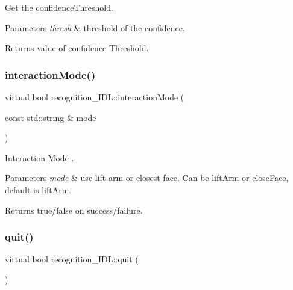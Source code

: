 Get the confidence\+Threshold. 


\begin{DoxyParams}{Parameters}
{\em thresh} & threshold of the confidence. \\
\hline
\end{DoxyParams}
\begin{DoxyReturn}{Returns}
value of confidence Threshold. 
\end{DoxyReturn}
\mbox{\label{classrecognition__IDL_afb70498b2cf99712cfad0e19d171dcab}} 
\subsubsection{\texorpdfstring{interaction\+Mode()}{interactionMode()}}
{\footnotesize\ttfamily virtual bool recognition\+\_\+\+I\+D\+L\+::interaction\+Mode (\begin{DoxyParamCaption}\item[{const std\+::string \&}]{mode }\end{DoxyParamCaption})\hspace{0.3cm}{\ttfamily [virtual]}}



Interaction Mode . 


\begin{DoxyParams}{Parameters}
{\em mode} & use lift arm or closest face. Can be lift\+Arm or close\+Face, default is lift\+Arm. \\
\hline
\end{DoxyParams}
\begin{DoxyReturn}{Returns}
true/false on success/failure. 
\end{DoxyReturn}
\mbox{\label{classrecognition__IDL_a42d5f63c8461c081cf2c17311bed5375}} 
\subsubsection{\texorpdfstring{quit()}{quit()}}
{\footnotesize\ttfamily virtual bool recognition\+\_\+\+I\+D\+L\+::quit (\begin{DoxyParamCaption}{ }\end{DoxyParamCaption})\hspace{0.3cm}{\ttfamily [virtual]}}



